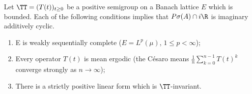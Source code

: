 \begin{corollary}\label{cor:c3-4.3}
	Let $\TT = (T(t))_{t \geq 0}$ be a positive semigroup on a Banach lattice $E$ which is bounded. 
	Each of the following conditions implies that $P\sigma(A)\cap i\R $ is imaginary additively cyclic.
	\begin{enumerate}[\upshape (i)]
		\item E is weakly sequentially complete (\eg $E = L^{p}(\mu)$, $1 \leq p < \infty$);
		\item Every operator $T(t)$ is mean ergodic (\ie the Césaro means $\frac{1}{n}\sum_{k=0}^{n-1}T(t)^{k}$ converge strongly as $n \to  \infty$);
		\item There is a strictly positive linear form which is $\TT$-invariant.
	\end{enumerate}
\end{corollary}
